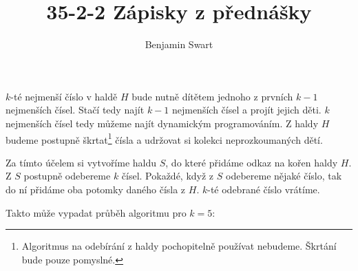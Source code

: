\documentclass{article}
\title{35-2-2 Zápisky z přednášky}
\author{Benjamin Swart}
\begin{document}
\maketitle

$k$-té nejmenší číslo v haldě $H$ bude nutně dítětem jednoho z prvních $k-1$ nejmenších čísel. Stačí tedy najít $k-1$ nejmenších čísel a projít jejich děti. $k$ nejmenších čísel tedy můžeme najít dynamickým programováním. Z haldy $H$ budeme postupně škrtat\footnote{Algoritmus na odebírání z haldy pochopitelně používat nebudeme. Škrtání bude pouze pomyslné.} čísla a udržovat si kolekci neprozkoumaných dětí.

Za tímto účelem si vytvoříme haldu $S$, do které přidáme odkaz na kořen haldy $H$. Z $S$ postupně odebereme $k$ čísel. Pokaždé, když z $S$ odebereme nějaké číslo, tak do ní přidáme oba potomky daného čísla z $H$. $k$-té odebrané číslo vrátíme.

Takto může vypadat průběh algoritmu pro $k = 5$:
\end{document}
